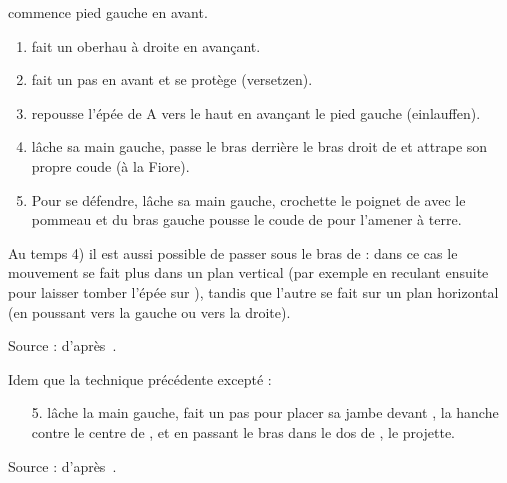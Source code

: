 \begin{technique}
\label{épée-longue:tech:dg-armringen-einlauffen}

\A commence pied gauche en avant.

\begin{enumerate}
	\item \A fait un oberhau à droite en avançant.
	\item \D fait un pas en avant et se protège (versetzen).
	\item \D repousse l'épée de A vers le haut en avançant le pied gauche (einlauffen).
	\item \D lâche sa main gauche, passe le bras derrière le bras droit de \A et attrape son propre coude (à la Fiore).
	\item Pour se défendre, \A lâche sa main gauche, crochette le poignet de \D avec le pommeau et du bras gauche pousse le coude de \D pour l'amener à terre.
\end{enumerate}

Au temps 4) il est aussi possible de passer sous le bras de \A : dans ce cas le mouvement se fait plus dans un plan vertical (par exemple en reculant ensuite pour laisser tomber l'épée sur \A), tandis que l'autre se fait sur un plan horizontal (en poussant \A vers la gauche ou vers la droite).

Source : d'après~\cite{kronenburg:dijon:going_distance:2015}.

\end{technique}


\begin{technique}
\label{épée-longue:tech:dg-leibringen-einlauffen}

Idem que la technique précédente excepté :
\begin{enumerate}
	\item[5.] \A lâche la main gauche, fait un pas pour placer sa jambe devant \D, la hanche contre le centre de \D, et en passant le bras dans le dos de \D, \A le projette.
\end{enumerate}

Source : d'après~\cite{kronenburg:dijon:going_distance:2015}.

\end{technique}




